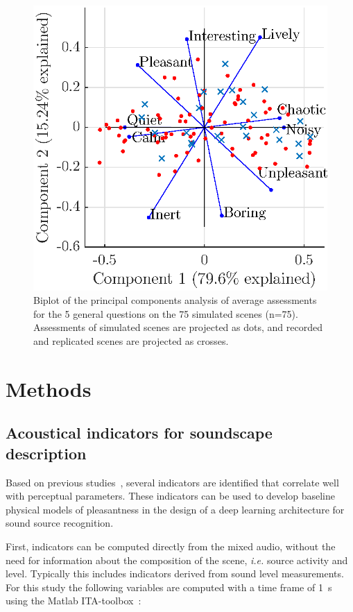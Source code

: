 \documentclass[twocolumn]{article}
\begin{document}
\begin{figure}[h]
    \centering
    \includegraphics[width=0.8\columnwidth]{figures/pca_sim.eps}
    \caption{Biplot of the principal components analysis of average assessments for the 5 general questions on the 75 simulated scenes (n=75). Assessments of simulated scenes are projected as dots, and recorded and replicated scenes are projected as crosses.}\label{fig:pspace_sim}
\end{figure}


\section{Methods}
\label{sec:methods}

\subsection{Acoustical indicators for soundscape description}
\label{sec:methods_inds}

Based on previous studies~\cite{aumond2017, gontier2018, ricciardi2014}, several indicators are identified that correlate well with perceptual parameters. These indicators can be used to develop baseline physical models of pleasantness in the design of a deep learning architecture for sound source recognition.

First, indicators can be computed directly from the mixed audio, without the need for information about the composition of the scene, \textit{i.e.} source activity and level. Typically this includes indicators derived from sound level measurements. For this study the following variables are computed with a time frame of 1~s using the Matlab ITA-toolbox~\cite{itatoolbox2017}:
\end{document}
